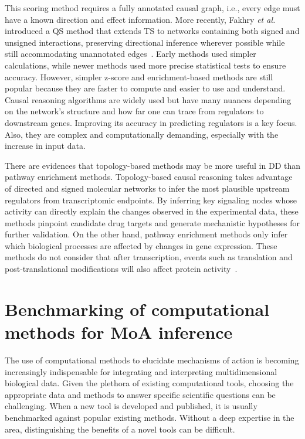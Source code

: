 This scoring method requires a fully annotated causal graph, i.e., every edge must have a known direction and effect information. 
More recently, Fakhry \textit{et al.}~\cite{RN158} introduced a \gls{QS} method that extends TS to networks containing both signed and unsigned interactions, preserving directional inference wherever possible while still accommodating unannotated edges~\cite{RN81}. 
Early methods used simpler calculations, while newer methods used more precise statistical tests to ensure accuracy. However, simpler z-score and enrichment-based methods are still popular because they are faster to compute and easier to use and understand. 
Causal reasoning algorithms are widely used but have many nuances depending on the network's structure and how far one can trace from regulators to downstream genes. 
Improving its accuracy in predicting regulators is a key focus. Also, they are complex and computationally demanding, especially with the increase in input data. 

There are evidences that topology-based methods may be more useful in DD than pathway enrichment methods. Topology-based causal reasoning takes advantage of directed and signed molecular networks to infer the most plausible upstream regulators from transcriptomic endpoints. By inferring key signaling nodes whose activity can directly explain the changes observed in the experimental data, these methods pinpoint candidate drug targets and generate mechanistic hypotheses for further validation. On the other hand, pathway enrichment methods only infer which biological processes are affected by changes in gene expression. These methods do not consider that after transcription, events such as translation and post-translational modifications will also affect protein activity~\cite{RN53}.

\section{Benchmarking of computational methods for MoA inference} %
\label{sec:benchmarking_of_computational_methods_for_MoA_inference}

The use of computational methods to elucidate mechanisms of action is becoming increasingly indispensable for integrating and interpreting multidimensional biological data. Given the plethora of existing computational tools, choosing the appropriate data and methods to answer specific scientific questions can be challenging. When a new tool is developed and published, it is usually benchmarked against popular existing methods. Without a deep expertise in the area, distinguishing the benefits of a novel tools can be difficult. 


